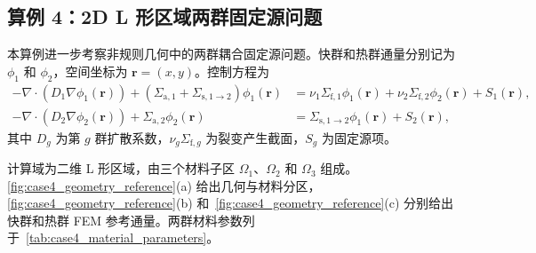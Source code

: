 \documentclass[final,3p,times,sort&compress]{elsarticle}
\begin{document}
\subsection{算例 4：2D L 形区域两群固定源问题}
\label{subsec:case4}

本算例进一步考察非规则几何中的两群耦合固定源问题。快群和热群通量分别记为 $\phi_1$ 和 $\phi_2$，空间坐标为 $\boldsymbol r=(x,y)$。控制方程为
\begin{equation}
    \begin{aligned}
        -\nabla \cdot \left( D_1 \nabla \phi_1(\boldsymbol r) \right)
        +\left(\Sigma_{\mathrm a,1} + \Sigma_{\mathrm s,1\rightarrow2}\right)\phi_1(\boldsymbol r)
         & =
        \nu_{1}\Sigma_{\mathrm f,1}\phi_1(\boldsymbol r)
        +\nu_{2}\Sigma_{\mathrm f,2}\phi_2(\boldsymbol r)
        +S_1(\boldsymbol r), \\
        -\nabla \cdot \left( D_2 \nabla \phi_2(\boldsymbol r) \right)
        +\Sigma_{\mathrm a,2}\phi_2(\boldsymbol r)
         & =
        \Sigma_{\mathrm s,1\rightarrow2}\phi_1(\boldsymbol r)
        +S_2(\boldsymbol r),
    \end{aligned}
    \label{eq:case4}
\end{equation}
其中 $D_g$ 为第 $g$ 群扩散系数，$\nu_g\Sigma_{\mathrm f,g}$ 为裂变产生截面，$S_g$ 为固定源项。

计算域为二维 L 形区域，由三个材料子区 $\Omega_1$、$\Omega_2$ 和 $\Omega_3$ 组成。\cref{fig:case4_geometry_reference}(a) 给出几何与材料分区，\cref{fig:case4_geometry_reference}(b) 和~\cref{fig:case4_geometry_reference}(c) 分别给出快群和热群 FEM 参考通量。两群材料参数列于~\cref{tab:case4_material_parameters}。
\end{document}
